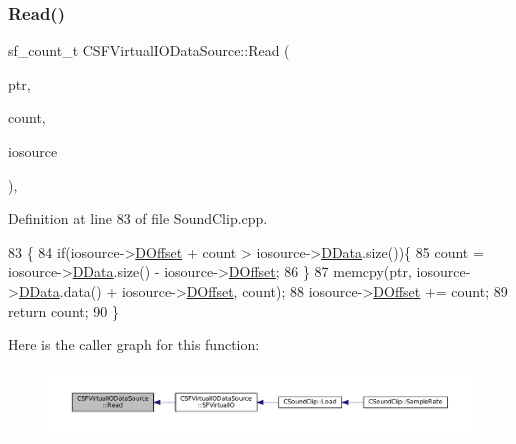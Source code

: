 \subsubsection{\texorpdfstring{Read()}{Read()}}
{\footnotesize\ttfamily sf\+\_\+count\+\_\+t C\+S\+F\+Virtual\+I\+O\+Data\+Source\+::\+Read (\begin{DoxyParamCaption}\item[{void $\ast$}]{ptr,  }\item[{sf\+\_\+count\+\_\+t}]{count,  }\item[{\hyperlink{classCSFVirtualIODataSource}{C\+S\+F\+Virtual\+I\+O\+Data\+Source} $\ast$}]{iosource }\end{DoxyParamCaption})\hspace{0.3cm}{\ttfamily [static]}, {\ttfamily [protected]}}



Definition at line 83 of file Sound\+Clip.\+cpp.


\begin{DoxyCode}
83                                                                                                     \{
84     \textcolor{keywordflow}{if}(iosource->\hyperlink{classCSFVirtualIODataSource_a29db7bf8a3a7103deacb80bf619919c8}{DOffset} + count > iosource->\hyperlink{classCSFVirtualIODataSource_ac03be5c46b6647150e12edc04fa52ede}{DData}.size())\{
85         count = iosource->\hyperlink{classCSFVirtualIODataSource_ac03be5c46b6647150e12edc04fa52ede}{DData}.size() - iosource->\hyperlink{classCSFVirtualIODataSource_a29db7bf8a3a7103deacb80bf619919c8}{DOffset};
86     \}
87     memcpy(ptr, iosource->\hyperlink{classCSFVirtualIODataSource_ac03be5c46b6647150e12edc04fa52ede}{DData}.data() + iosource->\hyperlink{classCSFVirtualIODataSource_a29db7bf8a3a7103deacb80bf619919c8}{DOffset}, count);
88     iosource->\hyperlink{classCSFVirtualIODataSource_a29db7bf8a3a7103deacb80bf619919c8}{DOffset} += count;
89     \textcolor{keywordflow}{return} count;
90 \}
\end{DoxyCode}
Here is the caller graph for this function\+:\nopagebreak
\begin{figure}[H]
\begin{center}
\leavevmode
\includegraphics[width=350pt]{classCSFVirtualIODataSource_a40021962590f0911d8af1020397fbba1_icgraph}
\end{center}
\end{figure}
\hypertarget{classCSFVirtualIODataSource_a04735e135ffc05dd53fce944e772fcfc}{}\label{classCSFVirtualIODataSource_a04735e135ffc05dd53fce944e772fcfc} 
